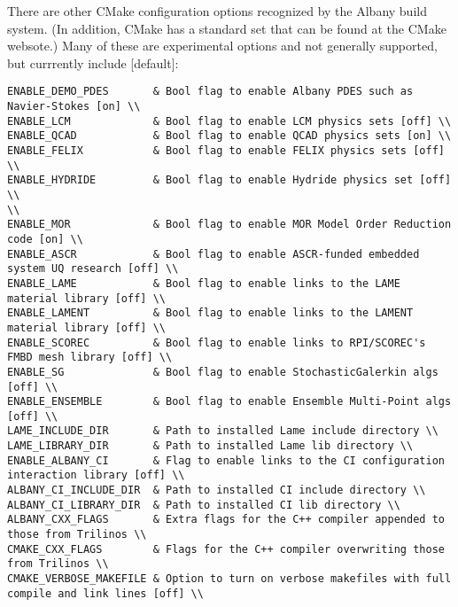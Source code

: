 \documentclass[pdf,12pt,report,strict]{SANDreport}
\theoremstyle{remark}
\begin{document}
There are other CMake configuration options recognized by the
Albany build system. (In addition, CMake has a standard set that
can be found at the CMake websote.) Many of these are experimental
options and not generally supported, but currrently include [default]:
\begin{verbatim}
ENABLE_DEMO_PDES       & Bool flag to enable Albany PDES such as Navier-Stokes [on] \\
ENABLE_LCM             & Bool flag to enable LCM physics sets [off] \\
ENABLE_QCAD            & Bool flag to enable QCAD physics sets [on] \\
ENABLE_FELIX           & Bool flag to enable FELIX physics sets [off] \\
ENABLE_HYDRIDE         & Bool flag to enable Hydride physics set [off] \\
\\
ENABLE_MOR             & Bool flag to enable MOR Model Order Reduction code [on] \\
ENABLE_ASCR            & Bool flag to enable ASCR-funded embedded system UQ research [off] \\
ENABLE_LAME            & Bool flag to enable links to the LAME material library [off] \\
ENABLE_LAMENT          & Bool flag to enable links to the LAMENT material library [off] \\
ENABLE_SCOREC          & Bool flag to enable links to RPI/SCOREC's FMBD mesh library [off] \\
ENABLE_SG              & Bool flag to enable StochasticGalerkin algs [off] \\
ENABLE_ENSEMBLE        & Bool flag to enable Ensemble Multi-Point algs [off] \\
LAME_INCLUDE_DIR       & Path to installed Lame include directory \\
LAME_LIBRARY_DIR       & Path to installed Lame lib directory \\
ENABLE_ALBANY_CI       & Flag to enable links to the CI configuration interaction library [off] \\
ALBANY_CI_INCLUDE_DIR  & Path to installed CI include directory \\
ALBANY_CI_LIBRARY_DIR  & Path to installed CI lib directory \\
ALBANY_CXX_FLAGS       & Extra flags for the C++ compiler appended to those from Trilinos \\
CMAKE_CXX_FLAGS        & Flags for the C++ compiler overwriting those from Trilinos \\
CMAKE_VERBOSE_MAKEFILE & Option to turn on verbose makefiles with full compile and link lines [off] \\
\end{verbatim}
\end{document}
